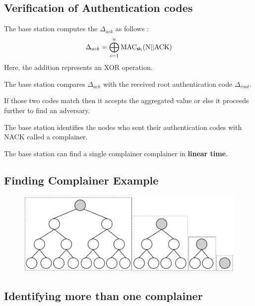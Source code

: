 \documentclass[%
  slidesonly,%
  semlayer%
  ]{seminar}                                  %
\newcommand{\sk}{\sf{sk}}
\begin{document}
\begin{slide}
    \subsection*{Verification of Authentication codes}
        \vfill
        The base station computes the $\Delta_{ack}$ as follows :
        \begin{equation*}
          \displaystyle{\Delta_{ack} = \bigoplus_{i = 1}^n \mbox{MAC}_{\sk_{i}}(\mbox{N} || \mbox{ACK}) }
        \end{equation*}
        Here, the addition represents an XOR operation.

        The base station compares   $\Delta_{ack}$ with the received root authentication code $\Delta_{root}$. 
        
        If those two codes match then it accepts the aggregated value or else it proceeds further to find an adversary. 

        The base station identifies the nodes who sent their authentication codes with NACK called a complainer. 
        
        The base station can find a single complainer complainer in \textbf{linear time}.

        \vfill
        \clearpage

    \subsection*{Finding Complainer Example}
      \vfill
        \begin{figure}[t]
          \centering
          \includegraphics[scale=0.4]{images/forest.png}
        \end{figure}
      \vfill
      \clearpage

    \subsection*{Identifying more than one complainer}
        \vfill
        

\end{slide}
\end{document}

